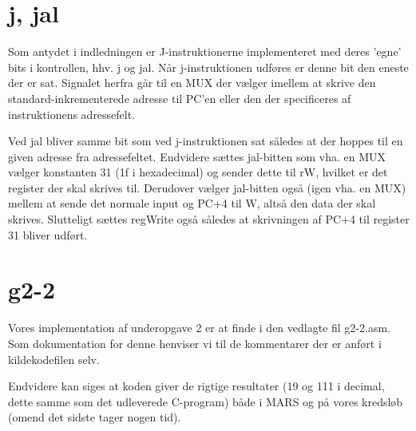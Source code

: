 \documentclass[10pt,a4paper,danish]{article}
\begin{document}
\section{j, jal}
Som antydet i indledningen er J-instruktionerne implementeret med deres 'egne'
bits i kontrollen, hhv. j og jal. Når j-instruktionen udføres er denne bit den
eneste der er sat. Signalet herfra går til en MUX der vælger imellem at skrive
den standard-inkrementerede adresse til PC'en eller den der specificeres af
instruktionens adressefelt. 

Ved jal bliver samme bit som ved j-instruktionen sat således at der hoppes til
en given adresse fra adressefeltet. Endvidere sættes jal-bitten som vha. en MUX vælger
konstanten 31 (1f i hexadecimal) og sender dette til rW, hvilket er det register
der skal skrives til. Derudover vælger jal-bitten også (igen vha. en MUX) mellem
at sende det normale input og PC+4 til W, altså den data der skal skrives.
Slutteligt sættes regWrite også således at skrivningen af PC+4 til register 31
bliver udført.

\section{g2-2}
Vores implementation af underopgave 2 er at finde i den vedlagte fil g2-2.asm.
Som dokumentation for denne henviser vi til de kommentarer der er anført i
kildekodefilen selv. 

Endvidere kan siges at koden giver de rigtige resultater (19 og 111 i decimal,
dette samme som det udleverede C-program) både i MARS og på vores
kredsløb (omend det sidste tager nogen tid).
\end{document}

